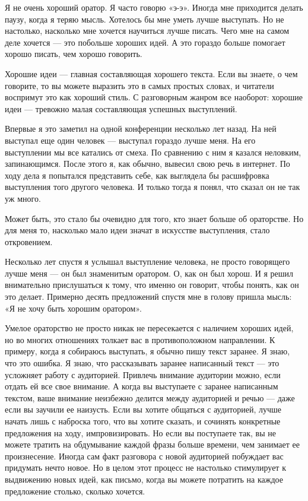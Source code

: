 \documentclass[ebook,12pt,oneside,openany]{memoir}
\author{Пол Грэм} \date{}
\begin{document}
\maketitle

Я не очень хороший оратор. Я часто говорю «э-э». Иногда мне приходится
делать паузу, когда я теряю мысль. Хотелось бы мне уметь лучше
выступать. Но не настолько, насколько мне хочется научиться лучше
писать. Чего мне на самом деле хочется — это побольше хороших идей. А
это гораздо больше помогает хорошо писать, чем хорошо говорить.

Хорошие идеи — главная составляющая хорошего текста. Если вы знаете, о
чем говорите, то вы можете выразить это в самых простых словах, и
читатели воспримут это как хороший стиль. С разговорным жанром все
наоборот: хорошие идеи — тревожно малая составляющая успешных
выступлений.

Впервые я это заметил на одной конференции несколько лет назад. На ней
выступал еще один человек — выступал гораздо лучше меня. На его
выступлении мы все катались от смеха. По сравнению с ним я казался
неловким, запинающимся. После этого я, как обычно, вывесил свою речь в
интернет. По ходу дела я попытался представить себе, как выглядела бы
расшифровка выступления того другого человека. И только тогда я понял,
что сказал он не так уж много.

Может быть, это стало бы очевидно для того, кто знает больше об
ораторстве. Но для меня то, насколько мало идеи значат в искусстве
выступления, стало откровением.

Несколько лет спустя я услышал выступление человека, не просто
говорящего лучше меня — он был знаменитым оратором. О, как он был
хорош. И я решил внимательно прислушаться к тому, что именно он
говорит, чтобы понять, как он это делает. Примерно десять предложений
спустя мне в голову пришла мысль: «Я не хочу быть хорошим оратором».

Умелое ораторство не просто никак не пересекается с наличием хороших
идей, но во многих отношениях толкает вас в противоположном
направлении. К примеру, когда я собираюсь выступать, я обычно пишу
текст заранее. Я знаю, что это ошибка. Я знаю, что рассказывать
заранее написанный текст — это усложняет работу с аудиторией. Привлечь
внимание аудитории можно, если отдать ей все свое внимание. А когда вы
выступаете с заранее написанным текстом, ваше внимание неизбежно
делится между аудиторией и речью — даже если вы заучили ее наизусть.
Если вы хотите общаться с аудиторией, лучше начать лишь с наброска
того, что вы хотите сказать, и сочинять конкретные предложения на
ходу, импровизировать. Но если вы поступаете так, вы не можете тратить
на обдумывание каждой фразы больше времени, чем занимает ее
произнесение. Иногда сам факт разговора с новой аудиторией побуждает
вас придумать нечто новое. Но в целом этот процесс не настолько
стимулирует к выдвижению новых идей, как письмо, когда вы можете
потратить на каждое предложение столько, сколько хочется.
\end{document}
